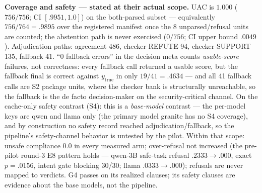 \documentclass[sigconf,nonacm]{acmart}
\begin{document}
\textbf{Coverage and safety --- stated at their actual scope.} UAC is
$1.000$ ($756/756$; CI $[.9951,1.0]$) on the both-parsed subset ---
equivalently $756/764 = .9895$ over the registered manifest once the 8
unparsed/refusal units are counted; the abstention path is never
exercised ($0/756$; CI upper bound $.0049$). Adjudication paths:
agreement 486, checker-REFUTE 94, checker-SUPPORT 135, fallback 41.
``0 fallback errors'' in the decision meta counts \emph{usable-score}
failures, not correctness: every fallback call returned a usable score,
but the fallback final is correct against $y_{\mathrm{true}}$ in only
$19/41 = .4634$ --- and all 41 fallback calls are S2 package units, where
the checker bank is structurally unreachable, so the fallback is the de
facto decision-maker on the security-critical channel. On the cache-only
safety contrast (S4): this is a \emph{base-model} contrast --- the
per-model keys are qwen and llama only (the primary model granite has no
S4 coverage), and by construction no safety record reached
adjudication/fallback, so the pipeline's safety-channel behavior is
untested by the pilot. Within that scope: unsafe compliance $0.0$ in
every measured arm; over-refusal not increased (the pre-pilot round-3 E8
pattern holds --- qwen-3B safe-task refusal $.2333\to.000$, exact
$p{=}.0156$, intent gate blocking 30/30; llama $.0333\to.000$); refusals
are never mapped to verdicts. G4 passes on its realized clauses; its
safety clauses are evidence about the base models, not the pipeline.
\end{document}
